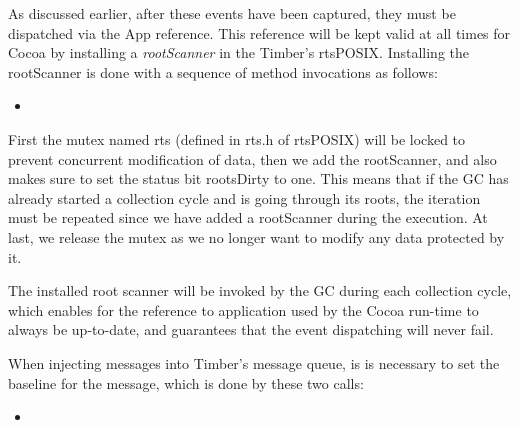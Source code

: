\documentclass[a4paper]{article}
\newcommand{\timbercode}[2]
  {\begin{itemize}\item[]\end{itemize}}
\begin{document}
As discussed earlier, after these events have been captured, they must be dispatched via the App reference. This reference will be kept valid at all times for Cocoa by installing a \textit{rootScanner} in the Timber's rtsPOSIX. Installing the rootScanner is done with a sequence of method invocations as follows:

\timbercode{rootScanner}{}

First the mutex named rts (defined in rts.h of rtsPOSIX) will be locked to prevent concurrent modification of data, then we add the rootScanner, and also makes sure to set the status bit rootsDirty to one. This means that if the GC has already started a collection cycle and is going through its roots, the iteration must be repeated since we have added a rootScanner during the execution. At last, we release the mutex as we no longer want to modify any data protected by it.

The installed root scanner will be invoked by the GC during each collection cycle, which enables for the reference to application used by the Cocoa run-time to always be up-to-date, and guarantees that the event dispatching will never fail.

When injecting messages into Timber's message queue, is is necessary to set the baseline for the message, which is done by these two calls:

\timbercode{rootScanner2}{}
\end{document}
